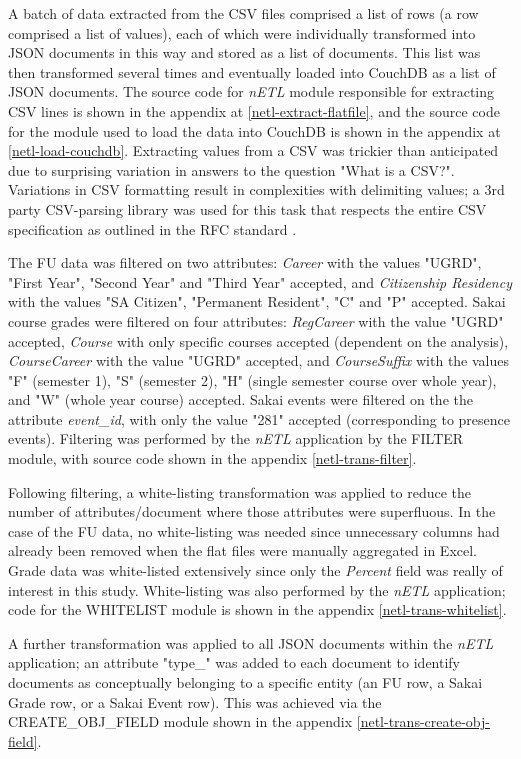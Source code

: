A batch of data extracted from the CSV files comprised a list of rows (a row comprised a list of values), each of which were individually transformed into JSON documents in this way and stored as a list of documents. This list was then transformed several times and eventually loaded into CouchDB as a list of JSON documents. The source code for \textit{nETL} module responsible for extracting CSV lines is shown in the appendix at \ref{netl-extract-flatfile}, and the source code for the module used to load the data into CouchDB is shown in the appendix at \ref{netl-load-couchdb}. Extracting values from a CSV was trickier than anticipated due to surprising variation in answers to the question "What is a CSV?". Variations in CSV formatting result in complexities with delimiting values; a 3rd party CSV-parsing library was used for this task that respects the entire CSV specification as outlined in the RFC standard \cite{rfc4180}.

The FU data was filtered on two attributes: \textit{Career} with the values "UGRD", "First Year", "Second Year" and "Third Year" accepted, and \textit{Citizenship Residency} with the values "SA Citizen", "Permanent Resident", "C" and "P" accepted. Sakai course grades were filtered on four attributes: \textit{RegCareer} with the value "UGRD" accepted, \textit{Course} with only specific courses accepted (dependent on the analysis), \textit{CourseCareer} with the value "UGRD" accepted, and \textit{CourseSuffix} with the values "F" (semester 1), "S" (semester 2), "H" (single semester course over whole year), and "W" (whole year course) accepted. Sakai events were filtered on the the attribute \textit{event\_id}, with only the value "281" accepted (corresponding to presence events). Filtering was performed by the \textit{nETL} application by the FILTER module, with source code shown in the appendix \ref{netl-trans-filter}.

Following filtering, a white-listing transformation was applied to reduce the number of attributes/document where those attributes were superfluous. In the case of the FU data, no white-listing was needed since unnecessary columns had already been removed when the flat files were manually aggregated in Excel. Grade data was white-listed extensively since only the \textit{Percent} field was really of interest in this study. White-listing was also performed by the \textit{nETL} application; code for the WHITELIST module is shown in the appendix \ref{netl-trans-whitelist}.

A further transformation was applied to all JSON documents within the \textit{nETL} application; an attribute "type\_" was added to each document to identify documents as conceptually belonging to a specific entity (an FU row, a Sakai Grade row, or a Sakai Event row). This was achieved via the CREATE\_OBJ\_FIELD module shown in the appendix \ref{netl-trans-create-obj-field}.

